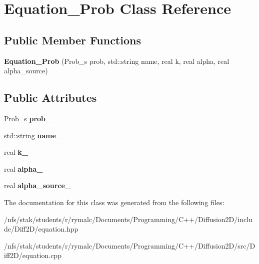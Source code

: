 \hypertarget{classEquation__Prob}{
\section{Equation\_\-Prob Class Reference}
\label{classEquation__Prob}
}
\subsection*{Public Member Functions}
\begin{DoxyCompactItemize}
\item 
\hypertarget{classEquation__Prob_a8eda60c6fe1e289ac5384cdf530cb47b}{
{\bfseries Equation\_\-Prob} (Prob\_\-s prob, std::string name, real k, real alpha, real alpha\_\-source)}
\label{classEquation__Prob_a8eda60c6fe1e289ac5384cdf530cb47b}

\end{DoxyCompactItemize}
\subsection*{Public Attributes}
\begin{DoxyCompactItemize}
\item 
\hypertarget{classEquation__Prob_a8761e4cfb7c9c934d1827a91625d7643}{
Prob\_\-s {\bfseries prob\_\-}}
\label{classEquation__Prob_a8761e4cfb7c9c934d1827a91625d7643}

\item 
\hypertarget{classEquation__Prob_af9c78d17a5b69f44175e95cef57c05d3}{
std::string {\bfseries name\_\-}}
\label{classEquation__Prob_af9c78d17a5b69f44175e95cef57c05d3}

\item 
\hypertarget{classEquation__Prob_add8db541a0ff4a402b95e2a70a3ad7a8}{
real {\bfseries k\_\-}}
\label{classEquation__Prob_add8db541a0ff4a402b95e2a70a3ad7a8}

\item 
\hypertarget{classEquation__Prob_ab8c2b9f46d6d9393c6556d0e734aae61}{
real {\bfseries alpha\_\-}}
\label{classEquation__Prob_ab8c2b9f46d6d9393c6556d0e734aae61}

\item 
\hypertarget{classEquation__Prob_aeb3f0d6aa0ffbbd16bc0866f177ec13e}{
real {\bfseries alpha\_\-source\_\-}}
\label{classEquation__Prob_aeb3f0d6aa0ffbbd16bc0866f177ec13e}

\end{DoxyCompactItemize}


The documentation for this class was generated from the following files:\begin{DoxyCompactItemize}
\item 
/nfs/stak/students/r/rymalc/Documents/Programming/C++/Diffusion2D/include/Diff2D/equation.hpp\item 
/nfs/stak/students/r/rymalc/Documents/Programming/C++/Diffusion2D/src/Diff2D/equation.cpp\end{DoxyCompactItemize}
